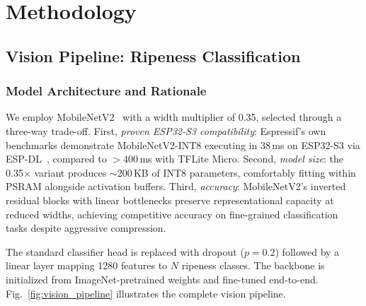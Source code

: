 \documentclass[conference]{IEEEtran}
\begin{document}
    \section{Methodology}
    \label{sec:methodology}

    \subsection{Vision Pipeline: Ripeness Classification}

    \subsubsection{Model Architecture and Rationale}

    We employ MobileNetV2~\cite{sandler2018mobilenetv2} with a width multiplier of 0.35, selected through a three-way trade-off. First, \textit{proven ESP32-S3 compatibility}: Espressif's own benchmarks demonstrate MobileNetV2-INT8 executing in 38\,ms on ESP32-S3 via ESP-DL~\cite{espdl2024}, compared to $>$400\,ms with TFLite Micro. Second, \textit{model size}: the 0.35$\times$ variant produces $\sim$200\,KB of INT8 parameters, comfortably fitting within PSRAM alongside activation buffers. Third, \textit{accuracy}: MobileNetV2's inverted residual blocks with linear bottlenecks preserve representational capacity at reduced widths, achieving competitive accuracy on fine-grained classification tasks despite aggressive compression.

    The standard classifier head is replaced with dropout ($p=0.2$) followed by a linear layer mapping 1280 features to $N$ ripeness classes. The backbone is initialized from ImageNet-pretrained weights and fine-tuned end-to-end. Fig.~\ref{fig:vision_pipeline} illustrates the complete vision pipeline.
\end{document}
